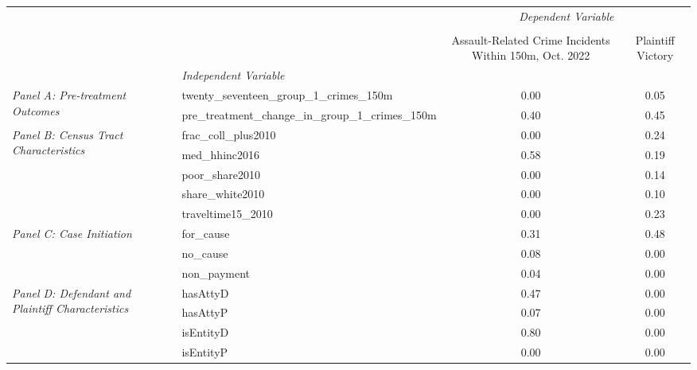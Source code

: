 \begin{tabular}{llcc}
\toprule
 &  & \multicolumn{2}{c}{\textit{Dependent Variable}} \\
\cline{3-4}
\\
 &  & Assault-Related Crime Incidents Within 150m, Oct. 2022 & Plaintiff Victory \\
 & \emph{Independent Variable} &  &  \\
\midrule
\multirow[c]{2}{3cm}{\textit{Panel A: Pre-treatment Outcomes}} & twenty_seventeen_group_1_crimes_150m & 0.00 & 0.05 \\
 & pre_treatment_change_in_group_1_crimes_150m & 0.40 & 0.45 \\
\cline{1-4}
\multirow[c]{5}{3cm}{\textit{Panel B: Census Tract Characteristics}} & frac_coll_plus2010 & 0.00 & 0.24 \\
 & med_hhinc2016 & 0.58 & 0.19 \\
 & poor_share2010 & 0.00 & 0.14 \\
 & share_white2010 & 0.00 & 0.10 \\
 & traveltime15_2010 & 0.00 & 0.23 \\
\cline{1-4}
\multirow[c]{3}{3cm}{\textit{Panel C: Case Initiation}} & for_cause & 0.31 & 0.48 \\
 & no_cause & 0.08 & 0.00 \\
 & non_payment & 0.04 & 0.00 \\
\cline{1-4}
\multirow[c]{4}{3cm}{\textit{Panel D: Defendant and Plaintiff Characteristics}} & hasAttyD & 0.47 & 0.00 \\
 & hasAttyP & 0.07 & 0.00 \\
 & isEntityD & 0.80 & 0.00 \\
 & isEntityP & 0.00 & 0.00 \\
\cline{1-4}
\bottomrule
\end{tabular}

